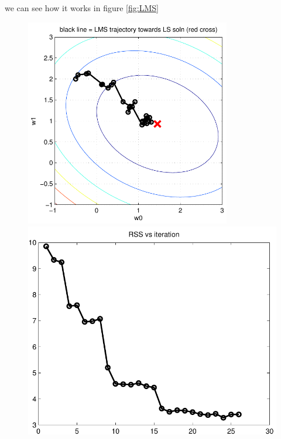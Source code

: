 \documentclass[12pt, a4paper]{article}
\begin{document}
\begin{itemize}
        we can see how it works in figure \ref{fig:LMS}
        \begin{figure}[htbp]
            \begin{minipage}[t]{0.45\textwidth}
                \includegraphics[width=0.8\textwidth]{figures/fig8_8a.pdf}
            \end{minipage}
            \hfill
            \begin{minipage}[t]{0.45\textwidth}
                \includegraphics[width=1.0\textwidth]{figures/fig8_8b.pdf}
            \end{minipage}

\end{figure}
\end{itemize}
\end{document}
